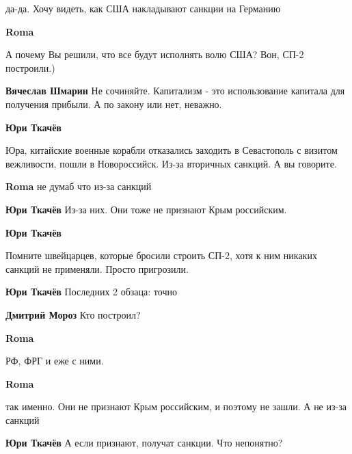 \begin{itemize}
да-да. Хочу видеть, как США накладывают санкции на Германию

\textbf{Roma}

А почему Вы решили, что все будут исполнять волю США? Вон, СП-2 построили.)

\textbf{Вячеслав Шмарин}
Не сочиняйте. Капитализм - это использование капитала для получения прибыли. А по закону или нет, неважно.

\textbf{Юри Ткачёв}

Юра, китайские военные корабли отказались заходить в Севастополь с визитом
вежливости, пошли в Новороссийск. Из-за вторичных санкций. А вы говорите.

\textbf{Roma}
не думаб что из-за санкций

\textbf{Юри Ткачёв}
Из-за них. Они тоже не признают Крым российским.

\textbf{Юри Ткачёв}

Помните швейцарцев, которые бросили строить СП-2, хотя к ним никаких санкций не применяли. Просто пригрозили.

\textbf{Юри Ткачёв}
Последних 2 обзаца: точно

\textbf{Дмитрий Мороз}
Кто построил?

\textbf{Roma}

РФ, ФРГ и еже с ними.

\textbf{Roma}

так именно. Они не признают Крым российским, и поэтому не зашли. А не из-за санкций

\textbf{Юри Ткачёв}
А если признают, получат санкции. Что непонятно?

\end{itemize} %
